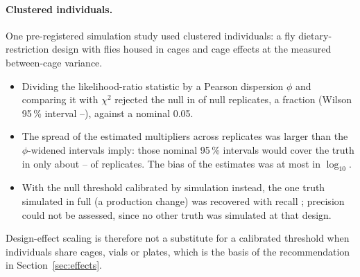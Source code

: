\paragraph{Clustered individuals.} One pre-registered simulation study used clustered individuals: a fly
dietary-restriction design with flies housed in cages and cage effects at the measured between-cage variance.
\begin{itemize}[leftmargin=1.5em,itemsep=1pt]
  \item Dividing the likelihood-ratio statistic by a Pearson dispersion $\phi$ and comparing it with $\chi^2$ rejected
    the null in  of  null replicates, a fraction  (Wilson 95\,\%
    interval --), against a nominal 0.05.
  \item The spread of the estimated multipliers across replicates was larger than the $\phi$-widened intervals imply:
    those nominal 95\,\% intervals would cover the truth in only about -- of
    replicates. The bias of the estimates was at most  in $\log_{10}$.
  \item With the null threshold calibrated by simulation instead, the one truth simulated in full (a production
    change) was recovered with recall ; precision could not be assessed, since no other truth was
    simulated at that design.
\end{itemize}
Design-effect scaling is therefore not a substitute for a calibrated threshold when individuals share cages, vials or plates, which
is the basis of the recommendation in Section~\ref{sec:effects}.


